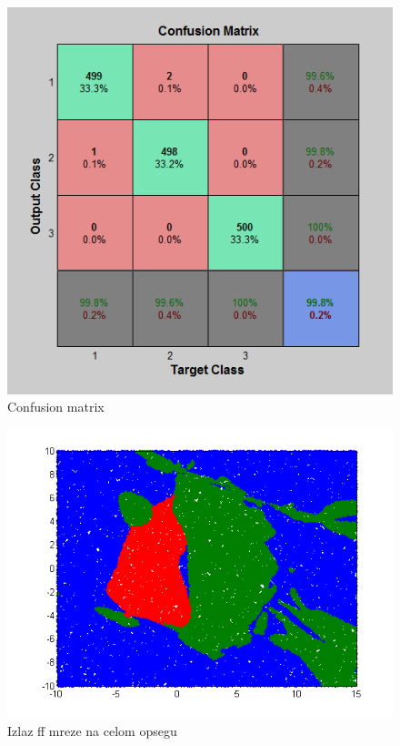 \documentclass{report}
\begin{document}
\begin{enumerate}
\begin{enumerate}
\begin{figure}[!h]
\begin{center}
\includegraphics[scale=0.7]{B1confussionFF4.png}
\caption{Confusion matrix}
\end{center}
\end{figure}

\begin{figure}[!h]
\begin{center}
\includegraphics[scale=0.8]{B1outputFF4Random50000.png}
\caption{Izlaz ff mreze na celom opsegu}
\end{center}
\end{figure}



\end{enumerate}



\end{enumerate}
\end{document}
